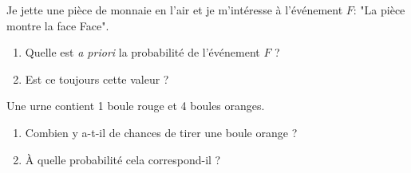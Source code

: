 \begin{pageParcoursu} 

 

Je jette une pièce de monnaie en l'air et je m'intéresse à l'événement $F$: "La pièce montre la face Face".
\begin{enumerate}
\item Quelle est \textit{a priori} la probabilité de l'événement $F$ ?
\item Est ce toujours cette valeur ?
\end{enumerate}
 




Une urne contient 1 boule rouge et 4 boules oranges. 

\begin{enumerate}[leftmargin=*]
\item Combien y a-t-il de chances de tirer une boule orange ? 
\item À quelle probabilité cela correspond-il ?
\end{enumerate}
 
 
\end{pageParcoursu}
